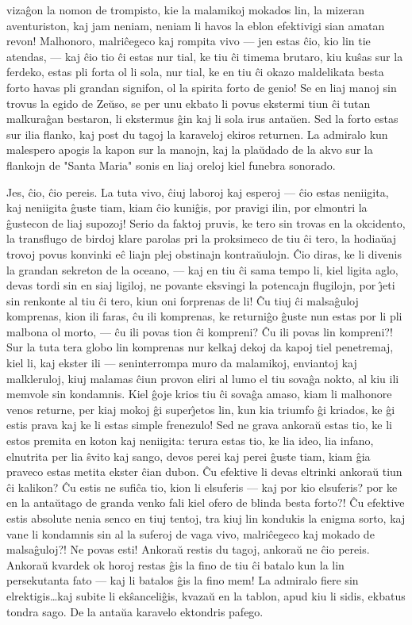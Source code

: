 viza\^gon la nomon de trompisto, kie la malamikoj mokados lin, la
mizeran aventuriston, kaj jam neniam, neniam li havos la eblon
efektivigi sian amatan revon! Malhonoro, malri\^cegeco kaj rompita
vivo --- jen estas \^cio, kio lin tie atendas, --- kaj \^cio tio
\^ci estas nur tial, ke tiu \^ci timema brutaro, kiu ku\^sas sur la
ferdeko, estas pli forta ol li sola, nur tial, ke en tiu \^ci okazo
maldelikata besta forto havas pli grandan signifon, ol la spirita
forto de genio! Se en liaj manoj sin trovus la egido de Ze\u uso, se
per unu ekbato li povus ekstermi tiun \^ci tutan malkura\^gan
bestaron, li ekstermus \^gin kaj li sola irus anta\u uen. Sed la
forto estas sur ilia flanko, kaj post du tagoj la karaveloj ekiros
returnen. La admiralo kun malespero apogis la kapon sur la manojn,
kaj la pla\u udado de la akvo sur la flankojn de "Santa Maria"
sonis en liaj oreloj kiel funebra sonorado.

   Jes, \^cio, \^cio pereis. La tuta vivo, \^ciuj laboroj kaj esperoj
--- \^cio estas neniigita, kaj neniigita \^guste tiam, kiam \^cio
kuni\^gis, por pravigi ilin, por elmontri la \^gustecon de liaj
supozoj! Serio da faktoj pruvis, ke tero sin trovas en la okcidento,
la transflugo de birdoj klare parolas pri la proksimeco de tiu \^ci
tero, la hodia\u uaj trovoj povus konvinki e\^c liajn plej obstinajn
kontra\u uulojn. \^Cio diras, ke li divenis la grandan sekreton de
la oceano, --- kaj en tiu \^ci sama tempo li, kiel ligita aglo,
devas tordi sin en siaj ligiloj, ne povante eksvingi la potencajn
flugilojn, por \^{\j}eti sin renkonte al tiu \^ci tero, kiun oni
forprenas de li! \^Cu tiuj \^ci malsa\^guloj komprenas, kion ili
faras, \^cu ili komprenas, ke returni\^go \^guste nun estas por li
pli malbona ol morto, --- \^cu ili povas tion \^ci kompreni? \^Cu
ili povas lin kompreni?! Sur la tuta tera globo lin komprenas nur
kelkaj dekoj da kapoj tiel penetremaj, kiel li, kaj ekster ili
--- seninterrompa muro da malamikoj, enviantoj kaj malkleruloj, kiuj
malamas \^ciun provon eliri al lumo el tiu sova\^ga nokto, al kiu
ili memvole sin kondamnis. Kiel \^goje krios tiu \^ci sova\^ga
amaso, kiam li malhonore venos returne, per kiaj mokoj \^gi
super\^{\j}etos lin, kun kia triumfo \^gi kriados, ke \^gi estis
prava kaj ke li estas simple frenezulo! Sed ne grava ankora\u u
estas tio, ke li estos premita en koton kaj neniigita: terura estas
tio, ke lia ideo, lia infano, elnutrita per lia \^svito kaj sango,
devos perei kaj perei \^guste tiam, kiam \^gia praveco estas metita
ekster \^cian dubon. \^Cu efektive li devas eltrinki ankora\u u tiun
\^ci kalikon? \^Cu estis ne sufi\^ca tio, kion li elsuferis --- kaj
por kio elsuferis? por ke en la anta\u utago de granda venko fali
kiel ofero de blinda besta forto?! \^Cu efektive estis absolute
nenia senco en tiuj tentoj, tra kiuj lin kondukis la enigma sorto,
kaj vane li kondamnis sin al la suferoj de vaga vivo, malri\^cegeco
kaj mokado de malsa\^guloj?! Ne povas esti! Ankora\u u restis du
tagoj, ankora\u u ne \^cio pereis. Ankora\u u kvardek ok horoj
restas \^gis la fino de tiu \^ci batalo kun la lin persekutanta fato
--- kaj li batalos \^gis la fino mem! La admiralo fiere sin
elrektigis\dots kaj subite li ek\^sanceli\^gis, kvaza\u u en la
tablon, apud kiu li sidis, ekbatus tondra sago. De la anta\u ua
karavelo ektondris pafego.

